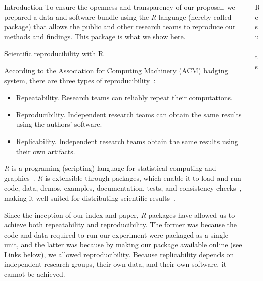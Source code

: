 \documentclass[20pt]{beamer}
\begin{document}
\begin{frame}[fragile,t]
\begin{columns}[t]
\begin{column}{0.33\linewidth}
\begin{block}{Introduction\vphantom{g}}
To ensure the openness and transparency of our proposal, we prepared a data and software bundle using the \textit{R} language (hereby called package) that allows the public and other research teams to reproduce our methods and findings. This package is what we show here.

    \end{block}


\vspace{1cm}
    \begin{block}{Scientific reproducibility with \textsf{R}}

According to the Association for Computing Machinery (ACM) badging system, there are three types of reproducibility~\cite{acm2020}:
\begin{itemize}
\item Repeatability. Research teams can reliably repeat their computations. 
\item Reproducibility. Independent research teams can obtain the same results using the authors' software.
\item Replicability. Independent research teams obtain the same results using their own artifacts.
\end{itemize}

\textit{R} is a programing (scripting) language for statistical computing and graphics~\cite{rlanguage}.
\textit{R} is extensible through packages, which enable it  to load and run code, data, demos, examples, documentation, tests, and consistency checks~\cite{wickham2015}, making it well suited for distributing scientific results~\cite{pebesma2012}.

Since the inception of our index and paper, \textit{R} packages have allowed us to achieve both repeatability and reproducibility. 
The former was because the code and data required to run our experiment were packaged as a single unit, and the latter was because by making our package available online (see Links below), we allowed reproducibility. 
Because replicability depends on independent research groups, their own data, and their own software, it cannot be achieved.



    \end{block}
\end{column}



\begin{column}{0.33\linewidth}
\vspace{1cm}
    \begin{block}{Results\vphantom{g}}
    \label{sec:results}
    

\end{block}
\end{column}
\end{columns}
\end{frame}
\end{document}
